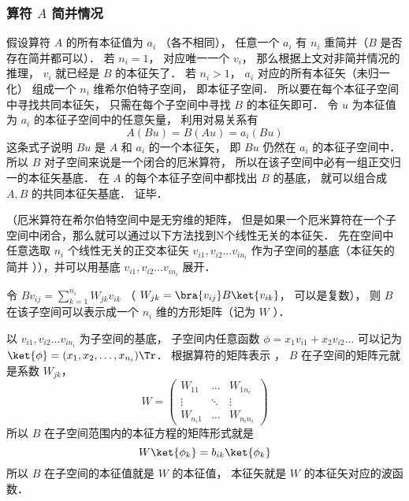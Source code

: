 \subsubsection{算符 $A$ 简并情况}
假设算符 $A$ 的所有本征值为 $a_i$ （各不相同）， 任意一个 $a_i$ 有 $n_i$ 重简并（$B$ 是否存在简并都可以）． 若 $n_i = 1$，  对应唯一一个 $v_i$，  那么根据上文对非简并情况的推理， $v_i$ 就已经是 $B$ 的本征矢了． 若 $n_i > 1$， $a_i$ 对应的所有本征矢（未归一化） 组成一个 $n_i$ 维希尔伯特子空间， 即本征子空间． 所以要在每个本征子空间中寻找共同本征矢， 只需在每个子空间中寻找 $B$ 的本征矢即可． 令 $u$ 为本征值为 $a_i$ 的本征子空间中的任意矢量， 利用对易关系有
\begin{equation}
A (B u) = B (A u) = a_i (B u)
\end{equation}
这条式子说明 $B u$ 是 $A$ 和 $a_i$ 的一个本征矢， 即 $B u$ 仍然在 $a_i$ 的本征子空间中． 所以 $B$ 对子空间来说是一个闭合的厄米算符， 所以在该子空间中必有一组正交归一的本征矢基底． 在 $A$ 的每个本征子空间中都找出 $B$ 的基底， 就可以组合成 $A, B$ 的共同本征矢基底． 证毕．


（厄米算符在希尔伯特空间中是无穷维的矩阵， 但是如果一个厄米算符在一个子空间中闭合，那么就可以通过以下方法找到N个线性无关的本征矢．%
先在空间中任意选取 $n_i$ 个线性无关的正交本征矢 $v_{i1}, v_{i2}\dots v_{i n_i}$ 作为子空间的基底（本征矢的简并%
）），并可以用基底 $v_{i1}, v_{i2}\dots v_{i n_i}$ 展开．

令 $B v_{ij} = \sum_{k=1}^{n_i} W_{jk}v_{ik}$ （ $W_{jk} = \bra{v_{ij}} B \ket{v_{ik}}$， 可以是复数）， 则 $B$ 在该子空间可以表示成一个 $n_i$ 维的方形矩阵（记为 $W$ ）．

以 $v_{i1}, v_{i2} \dots v_{i n_i}$ 为子空间的基底， 子空间内任意函数 $\phi  = x_1 v_{i1} + x_2 v_{i2}\dots$ 可以记为 $\ket{\phi} = (x_1, x_2, \dots, x_{n_i})\Tr$． 根据算符的矩阵表示
， $B$ 在子空间的矩阵元就是系数 $W_{jk}$， 
\begin{equation}
W = \begin{pmatrix}
W_{11} & \ldots & W_{1 n_i}\\
\vdots & \ddots & \vdots \\
W_{n_i 1} & \ldots & W_{n_i n_i}
\end{pmatrix}
\end{equation}
所以 $B$ 在子空间范围内的本征方程的矩阵形式就是
\begin{equation}
W \ket{\phi_k} = b_{ik} \ket{\phi_k}
\end{equation}
所以 $B$ 在子空间的本征值就是 $W$ 的本征值， 本征矢就是 $W$ 的本征矢对应的波函数．

